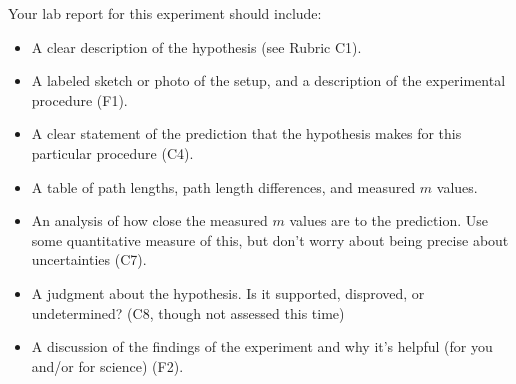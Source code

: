 Your lab report for this experiment should include:
\begin{itemize}
	\item A clear description of the hypothesis (see Rubric C1).
	
	\item A labeled sketch or photo of the setup, and a description of the experimental procedure (F1).
	
	\item A clear statement of the prediction that the hypothesis makes for this particular procedure (C4).

	\item A table of path lengths, path length differences, and measured $m$ values.
	
	\item An analysis of how close the measured $m$ values are to the prediction. Use some quantitative measure of this, but don't worry about being precise about uncertainties (C7).
	
	\item A judgment about the hypothesis. Is it supported, disproved, or undetermined? (C8, though not assessed this time)
	
	\item A discussion of the findings of the experiment and why it's helpful (for you and/or for science) (F2).
\end{itemize}

